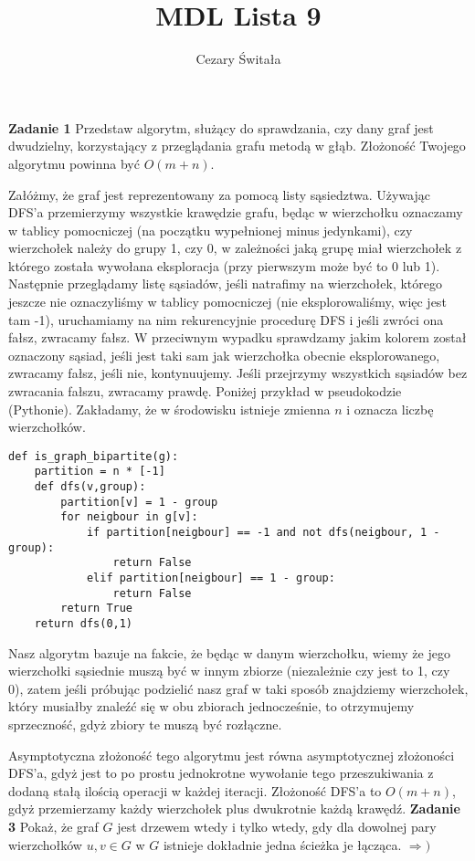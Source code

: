 \documentclass[12pt,a4paper]{article}
\title{MDL Lista 9}
\author{Cezary Świtała}
\begin{document}
\maketitle

\noindent
\textbf{Zadanie 1} Przedstaw algorytm, służący do sprawdzania, czy dany graf jest dwudzielny, korzystający z przeglądania grafu metodą w głąb. Złożoność Twojego algorytmu powinna być \( O(m+n) \).
\vskip 0.5cm

Załóżmy, że graf jest reprezentowany za pomocą listy sąsiedztwa. Używając DFS'a przemierzymy wszystkie krawędzie grafu, będąc w wierzchołku oznaczamy w tablicy pomocniczej (na początku wypełnionej minus jedynkami), czy wierzchołek należy do grupy 1, czy 0, w zależności jaką grupę miał wierzchołek z którego została wywołana eksploracja (przy pierwszym może być to 0 lub 1). Następnie przeglądamy listę sąsiadów, jeśli natrafimy na wierzchołek, którego jeszcze nie oznaczyliśmy w tablicy pomocniczej (nie eksplorowaliśmy, więc jest tam -1), uruchamiamy na nim rekurencyjnie procedurę DFS i jeśli zwróci ona fałsz, zwracamy fałsz. W przeciwnym wypadku sprawdzamy jakim kolorem został oznaczony sąsiad, jeśli jest taki sam jak wierzchołka obecnie eksplorowanego, zwracamy fałsz, jeśli nie, kontynuujemy. Jeśli przejrzymy wszystkich sąsiadów bez zwracania fałszu, zwracamy prawdę. Poniżej przykład w pseudokodzie (Pythonie). Zakładamy, że w środowisku istnieje zmienna \(n\) i oznacza liczbę wierzchołków.

\begin{lstlisting}
def is_graph_bipartite(g):
    partition = n * [-1]
    def dfs(v,group):
        partition[v] = 1 - group
        for neigbour in g[v]:
            if partition[neigbour] == -1 and not dfs(neigbour, 1 - group):
                return False
            elif partition[neigbour] == 1 - group:
                return False
        return True
    return dfs(0,1)                    
\end{lstlisting}

Nasz algorytm bazuje na fakcie, że będąc w danym wierzchołku, wiemy że jego wierzchołki sąsiednie muszą być w innym zbiorze (niezależnie czy jest to 1, czy 0), zatem jeśli próbując  podzielić nasz graf w taki sposób znajdziemy wierzchołek, który musiałby znaleźć się w obu zbiorach jednocześnie, to otrzymujemy sprzeczność, gdyż zbiory te muszą być rozłączne.

Asymptotyczna złożoność tego algorytmu jest równa asymptotycznej złożoności DFS'a, gdyż jest to po prostu jednokrotne wywołanie tego przeszukiwania z dodaną stałą ilością operacji w każdej iteracji. Złożoność DFS'a to \( O(m+n) \), gdyż przemierzamy każdy wierzchołek plus dwukrotnie każdą krawędź.
\newpage
\noindent
\textbf{Zadanie 3} Pokaż, że graf \(G\) jest drzewem wtedy i tylko wtedy, gdy dla dowolnej pary wierzchołków \( u,v \in G \) w \(G\) istnieje dokładnie jedna ścieżka je łącząca.
\vskip 0.5cm
\( \Rightarrow ) \)
\end{document}
